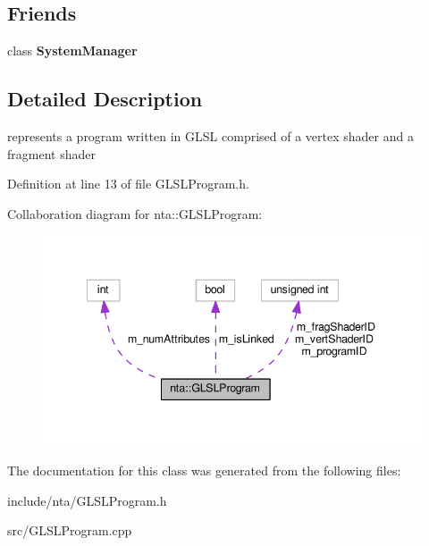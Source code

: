 \subsection*{Friends}
\begin{DoxyCompactItemize}
\item 
\mbox{\label{classnta_1_1GLSLProgram_ab1ef2aa9992dd8ae85793e1a1f980e1e}} 
class {\bfseries System\+Manager}
\end{DoxyCompactItemize}


\subsection{Detailed Description}
represents a program written in G\+L\+SL comprised of a vertex shader and a fragment shader 

Definition at line 13 of file G\+L\+S\+L\+Program.\+h.



Collaboration diagram for nta\+:\+:G\+L\+S\+L\+Program\+:\nopagebreak
\begin{figure}[H]
\begin{center}
\leavevmode
\includegraphics[width=341pt]{d0/df1/classnta_1_1GLSLProgram__coll__graph}
\end{center}
\end{figure}


The documentation for this class was generated from the following files\+:\begin{DoxyCompactItemize}
\item 
include/nta/G\+L\+S\+L\+Program.\+h\item 
src/G\+L\+S\+L\+Program.\+cpp\end{DoxyCompactItemize}
